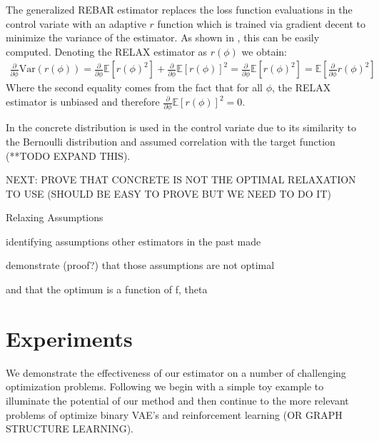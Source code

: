 \documentclass{article}
\newcommand{\relaxed}{r}
\newcommand{\var}{\text{Var}}
\begin{document}
The generalized REBAR estimator replaces the loss function evaluations in the control variate with an adaptive $\relaxed$ function which is trained via gradient decent to minimize the variance of the estimator. As shown in \cite{tucker2017rebar}, this can be easily computed. Denoting the RELAX estimator as $r(\phi)$ we obtain:
\begin{align}
    \frac{\partial}{\partial\phi}\var{(r(\phi))} = \frac{\partial}{\partial\phi}\mathbb{E}[r(\phi)^2] + \frac{\partial}{\partial\phi}\mathbb{E}[r(\phi)]^2 = \frac{\partial}{\partial\phi}\mathbb{E}[r(\phi)^2] = \mathbb{E}[\frac{\partial}{\partial\phi}r(\phi)^2]
\end{align}
Where the second equality comes from the fact that for all $\phi$, the RELAX estimator is unbiased and therefore $\frac{\partial}{\partial\phi}\mathbb{E}[r(\phi)]^2 = 0$.


In \cite{tucker2017rebar} the concrete distribution \cite{maddison2016concrete} is used in the control variate due to its similarity to the Bernoulli distribution and assumed correlation with the target function (**TODO EXPAND THIS).

NEXT: PROVE THAT CONCRETE IS NOT THE OPTIMAL RELAXATION TO USE (SHOULD BE EASY TO PROVE BUT WE NEED TO DO IT)



Relaxing Assumptions

identifying assumptions other estimators in the past made

demonstrate (proof?) that those assumptions are not optimal

and that the optimum is a function of {f, theta}



\section{Experiments}
We demonstrate the effectiveness of our estimator on a number of challenging optimization problems. Following \cite{tucker2017rebar} we begin with a simple toy example to illuminate the potential of our method and then continue to the more relevant problems of optimize binary VAE's and reinforcement learning (OR GRAPH STRUCTURE LEARNING).
\end{document}
